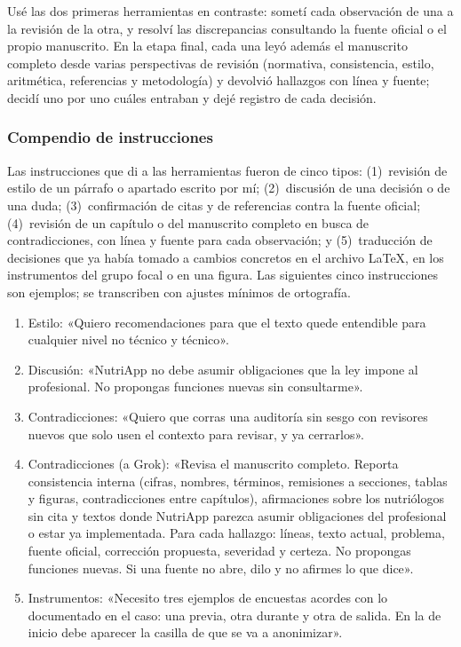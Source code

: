 \documentclass[12pt, a4paper]{article}
\begin{document}
Usé las dos primeras herramientas en contraste: sometí cada observación
de una a la revisión de la otra, y resolví las discrepancias
consultando la fuente oficial o el propio manuscrito. En la
etapa final, cada una leyó además el manuscrito completo desde varias
perspectivas de revisión (normativa, consistencia, estilo, aritmética,
referencias y metodología) y devolvió hallazgos con línea y fuente;
decidí uno por uno cuáles entraban y dejé registro de cada
decisión.
 
\subsubsection*{Compendio de instrucciones}
 
Las instrucciones que di a las herramientas fueron de cinco tipos:
(1)~revisión de estilo de un párrafo o apartado escrito por mí;
(2)~discusión de una decisión o de una duda; (3)~confirmación de citas y
de referencias contra la fuente oficial; (4)~revisión de un capítulo o
del manuscrito completo en busca de contradicciones, con línea y fuente
para cada observación; y (5)~traducción de decisiones que ya había
tomado a cambios concretos en el archivo \LaTeX{}, en los instrumentos
del grupo focal o en una figura. Las siguientes cinco instrucciones
son ejemplos; se transcriben con ajustes mínimos de ortografía.
 
\begin{enumerate}
 \item Estilo: «Quiero recomendaciones para
    que el texto quede entendible
    para cualquier
    nivel no técnico y técnico».
  \item Discusión: «NutriApp no debe asumir obligaciones que la ley
    impone al profesional. No propongas funciones nuevas sin
    consultarme».
  \item Contradicciones: «Quiero que corras una auditoría sin sesgo con
    revisores nuevos que solo usen el contexto para revisar, y ya
    cerrarlos».
  \item Contradicciones (a Grok): «Revisa el manuscrito completo.
    Reporta consistencia interna (cifras, nombres, términos, remisiones
    a secciones, tablas y figuras, contradicciones entre capítulos),
    afirmaciones sobre los nutriólogos sin cita y textos donde NutriApp
    parezca asumir obligaciones del profesional o estar ya
    implementada. Para cada hallazgo: líneas, texto actual, problema,
    fuente oficial, corrección propuesta, severidad y certeza. No
    propongas funciones nuevas. Si una fuente no abre, dilo y no
    afirmes lo que dice».
  \item Instrumentos: «Necesito tres ejemplos de encuestas acordes con lo
    documentado en el caso: una previa, otra durante y otra de salida.
    En la de inicio debe aparecer la casilla de que se va a anonimizar».
\end{enumerate}
\end{document}
